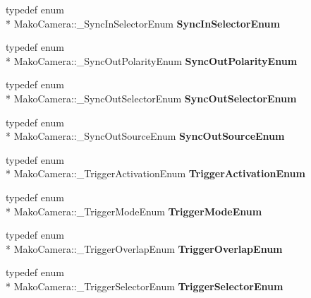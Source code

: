 \begin{DoxyCompactItemize}
\item 
\hypertarget{classMakoCamera_af10ed649b7586e6eceaca1c7dbf17de0}{typedef enum \\*
Mako\-Camera\-::\-\_\-\-Sync\-In\-Selector\-Enum {\bfseries Sync\-In\-Selector\-Enum}}\label{classMakoCamera_af10ed649b7586e6eceaca1c7dbf17de0}

\item 
\hypertarget{classMakoCamera_abdaf28ff9fdc3f95bdadb102f0bce117}{typedef enum \\*
Mako\-Camera\-::\-\_\-\-Sync\-Out\-Polarity\-Enum {\bfseries Sync\-Out\-Polarity\-Enum}}\label{classMakoCamera_abdaf28ff9fdc3f95bdadb102f0bce117}

\item 
\hypertarget{classMakoCamera_acbb886aa4864d8fbd875bf1c948148f2}{typedef enum \\*
Mako\-Camera\-::\-\_\-\-Sync\-Out\-Selector\-Enum {\bfseries Sync\-Out\-Selector\-Enum}}\label{classMakoCamera_acbb886aa4864d8fbd875bf1c948148f2}

\item 
\hypertarget{classMakoCamera_afb546192608ede71b43899957369f0d5}{typedef enum \\*
Mako\-Camera\-::\-\_\-\-Sync\-Out\-Source\-Enum {\bfseries Sync\-Out\-Source\-Enum}}\label{classMakoCamera_afb546192608ede71b43899957369f0d5}

\item 
\hypertarget{classMakoCamera_a3af14a264fbf86ff9bb23d4cb2837405}{typedef enum \\*
Mako\-Camera\-::\-\_\-\-Trigger\-Activation\-Enum {\bfseries Trigger\-Activation\-Enum}}\label{classMakoCamera_a3af14a264fbf86ff9bb23d4cb2837405}

\item 
\hypertarget{classMakoCamera_abcf43d9bb1ed447e24bcfb5da359b783}{typedef enum \\*
Mako\-Camera\-::\-\_\-\-Trigger\-Mode\-Enum {\bfseries Trigger\-Mode\-Enum}}\label{classMakoCamera_abcf43d9bb1ed447e24bcfb5da359b783}

\item 
\hypertarget{classMakoCamera_a7511b11a711126fd4850231a820e7add}{typedef enum \\*
Mako\-Camera\-::\-\_\-\-Trigger\-Overlap\-Enum {\bfseries Trigger\-Overlap\-Enum}}\label{classMakoCamera_a7511b11a711126fd4850231a820e7add}

\item 
\hypertarget{classMakoCamera_a8ac1b9979a81db688a3991bfe55fb9d3}{typedef enum \\*
Mako\-Camera\-::\-\_\-\-Trigger\-Selector\-Enum {\bfseries Trigger\-Selector\-Enum}}\label{classMakoCamera_a8ac1b9979a81db688a3991bfe55fb9d3}


\end{DoxyCompactItemize}
